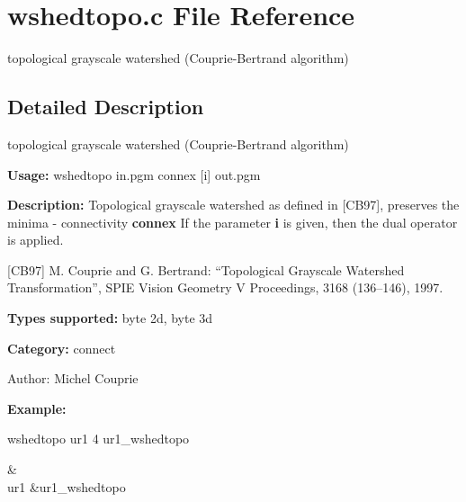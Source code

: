 \section{wshedtopo.c File Reference}
\label{wshedtopo_8c}
topological grayscale watershed (Couprie-Bertrand algorithm) 



\subsection{Detailed Description}
topological grayscale watershed (Couprie-Bertrand algorithm) 

{\bf Usage:} wshedtopo in.pgm connex [i] out.pgm

{\bf Description:} Topological grayscale watershed as defined in [CB97], preserves the minima - connectivity {\bf connex} If the parameter {\bf i} is given, then the dual operator is applied.

[CB97] M. Couprie and G. Bertrand: ``Topological Grayscale Watershed Transformation'', SPIE Vision Geometry V Proceedings, 3168 (136--146), 1997.

{\bf Types supported:} byte 2d, byte 3d

{\bf Category:} connect

\begin{Desc}
\item[Author:]Michel Couprie\end{Desc}
{\bf Example:}

wshedtopo ur1 4 ur1\_\-wshedtopo

\begin{TabularC}{2}
\hline
 &  \\\hline
ur1 &ur1\_\-wshedtopo  \\\hline
\end{TabularC}
